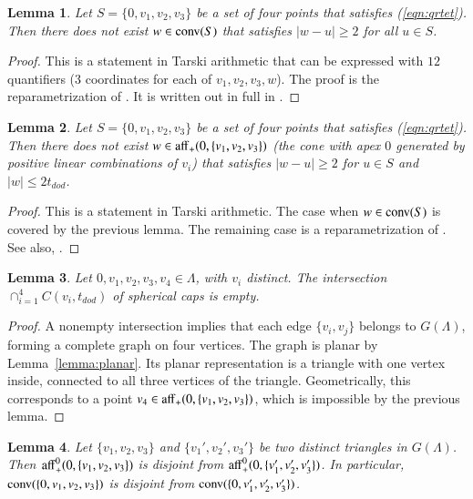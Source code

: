 \documentclass{article} %
\newtheorem{lemma}{Lemma}[subsection]
\begin{document}
\begin{lemma} Let $S=\{0,v_1,v_2,v_3\}$ be a set of four points
that satisfies (\ref{eqn:qrtet}).  Then
there does not exist $w\in{\operatorname{conv}}(S)$
that satisfies $|w-u|\ge 2$ for all
$u\in S$.
\end{lemma}

\begin{proof} This is a statement in Tarski arithmetic that can be
expressed with $12$ quantifiers ($3$ coordinates for each of
$v_1,v_2,v_3,w$). The proof is the reparametrization of
\cite[Lemma~4.15]{Hales:2006:DCG}. It is written out in full in
\cite[Lemma~3.3]{Hales:2002:Dodec}.
\end{proof}

\begin{lemma}\label{lemma:enclosed} 
Let $S=\{0,v_1,v_2,v_3\}$ be a set of four points
that satisfies (\ref{eqn:qrtet}).  Then
there does not exist $w\in{\operatorname{aff}}_+(0,\{v_1,v_2,v_3\})$
(the cone with apex $0$ 
generated by positive linear combinations of $v_i$) 
that satisfies $|w-u|\ge 2$ for 
$u\in S$ and $|w|\le 2t_{dod}$.
\end{lemma}

\begin{proof} This is a statement in Tarski arithmetic. The case when
$w\in{\operatorname{conv}}(S)$ is covered by the previous lemma. The remaining
case is a reparametrization of \cite[Lemma~4.19]{Hales:2006:DCG}. See
also, \cite[Cor~3.7]{Hales:2002:Dodec}.
\end{proof}

\begin{lemma}\label{lemma:4fold}  
Let $0,v_1,v_2,v_3,v_4\in\Lambda$, with
$v_i$ distinct.  The intersection $\cap_{i=1}^4 C(v_i,t_{dod})$
of spherical caps is empty.
\end{lemma}

\begin{proof}  A nonempty intersection implies that each
edge $\{v_i,v_j\}$ belongs to  $G(\Lambda)$, forming a complete graph
on four vertices.  The graph is planar by Lemma~\ref{lemma:planar}.
Its planar representation is a triangle with one vertex inside,
connected to all three vertices of the triangle.
Geometrically, this corresponds to a point $v_4\in{\operatorname{aff}}_+(0,\{v_1,v_2,v_3\})$, which is impossible by the previous lemma.
\end{proof}

\begin{lemma}  Let $\{v_1,v_2,v_3\}$ and $\{v_1',v_2',v_3'\}$
be two distinct triangles in $G(\Lambda)$.  Then
${\operatorname{aff}}_+^0(0,\{v_1,v_2,v_3\})$ is disjoint from
${\operatorname{aff}}_+^0(0,\{v_1',v_2',v_3'\})$.  In particular,
${\operatorname{conv}}(\{0,v_1,v_2,v_3\})$ is disjoint from
${\operatorname{conv}}(\{0,v_1',v_2',v_3'\})$.
\end{lemma}
\end{document}
